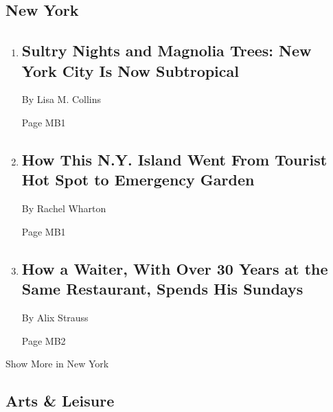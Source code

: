 \hypertarget{new-york}{%
\subsection{New York}\label{new-york}}

\begin{enumerate}
\def\labelenumi{\arabic{enumi}.}
\item
  \href{/2020/07/24/nyregion/climate-change-nyc.html}{}

  \hypertarget{sultry-nights-and-magnolia-trees-new-york-city-is-now-subtropical}{%
  \subsection{Sultry Nights and Magnolia Trees: New York City Is Now
  Subtropical}\label{sultry-nights-and-magnolia-trees-new-york-city-is-now-subtropical}}

  By Lisa M. Collins

  Page MB1
\item
  \href{/2020/07/23/nyregion/governors-island-nyc-urban-farm.html}{}

  \hypertarget{how-this-ny-island-went-from-tourist-hot-spot-to-emergency-garden}{%
  \subsection{How This N.Y. Island Went From Tourist Hot Spot to
  Emergency
  Garden}\label{how-this-ny-island-went-from-tourist-hot-spot-to-emergency-garden}}

  By Rachel Wharton

  Page MB1
\item
  \href{/2020/07/24/nyregion/coronavirus-JG-Melon-waiter-nyc.html}{}

  \hypertarget{how-a-waiter-with-over-30-years-at-the-same-restaurant-spends-his-sundays}{%
  \subsection{How a Waiter, With Over 30 Years at the Same Restaurant,
  Spends His
  Sundays}\label{how-a-waiter-with-over-30-years-at-the-same-restaurant-spends-his-sundays}}

  By Alix Strauss

  Page MB2
\end{enumerate}

Show More in New York

\hypertarget{arts--leisure}{%
\subsection{Arts \& Leisure}\label{arts--leisure}}

